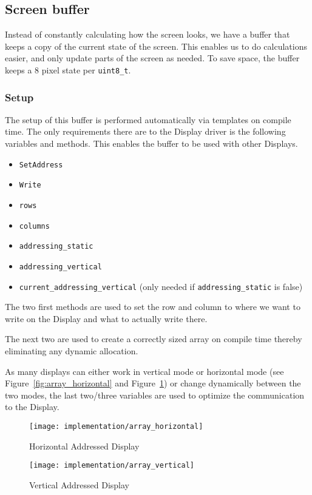 \subsection{Screen buffer}

Instead of constantly calculating how the screen looks, we have a buffer that keeps a copy of the current state of the screen. This enables us to do calculations easier, and only update parts of the screen as needed. 
To save space, the buffer keeps a 8 pixel state per \texttt{uint8\_t}.

\subsubsection{Setup}

The setup of this buffer is performed automatically via templates on compile time. The only requirements there are to the Display driver is the following variables and methods. This enables the buffer to be used with other Displays.

\begin{itemize}
\item \texttt{SetAddress}
\item \texttt{Write}
\item \texttt{rows}
\item \texttt{columns}
\item \texttt{addressing\_static}
\item \texttt{addressing\_vertical}
\item \texttt{current\_addressing\_vertical} (only needed if \texttt{addressing\_static} is false)
\end{itemize}

The two first methods are used to set the row and column to where we want to write on the Display and what to actually write there.

The next two are used to create a correctly sized array on compile time thereby eliminating any dynamic allocation.

As many displays can either work in vertical mode or horizontal mode (see Figure~\ref{fig:array_horizontal} and Figure~\ref{fig:array_vertical}) or change dynamically between the two modes, the last two/three variables are used to optimize the communication to the Display.

\begin{figure}
\centering
\begin{minipage}{.5\textwidth}
  \centering
  \texttt{[image: implementation/array\_horizontal]}
  \caption{Horizontal Addressed Display}
  \label{fig:array_horizontal}
\end{minipage}%
\begin{minipage}{.5\textwidth}
  \centering
  \texttt{[image: implementation/array\_vertical]}
  \caption{Vertical Addressed Display}
  \label{fig:array_vertical}
\end{minipage}
\end{figure}

